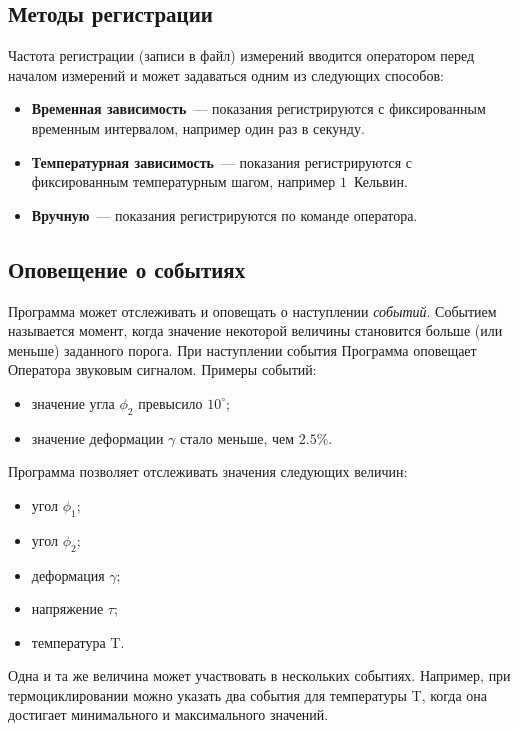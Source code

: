 \documentclass[12pt, a4paper, twocolumn]{report}
\begin{document}
\subsection{Методы регистрации}

\label{sec_registration_types}

Частота регистрации (записи в файл) измерений вводится оператором перед началом измерений и может задаваться одним из следующих способов:

\begin{itemize}
\item {\bf Временная зависимость}~--- показания регистрируются с фиксированным временным интервалом, например один раз в секунду.
\item {\bf Температурная зависимость}~--- показания регистрируются с фиксированным температурным шагом, например $1$~Кельвин.
\item \label{sec_reg_type_manual} {\bf Вручную}~--- показания регистрируются по команде оператора.
\end{itemize}

\subsection{Оповещение о событиях}
\label{sec_events}

Программа может отслеживать и оповещать о наступлении {\it событий}. Событием называется момент, когда значение некоторой величины становится больше (или меньше) заданного порога. При наступлении события Программа оповещает Оператора звуковым сигналом. Примеры событий:

\begin{itemize}
\item значение угла $\phi_2$ превысило $10^{\circ}$;
\item значение деформации $\gamma$ стало меньше, чем $2.5\%$.
\end{itemize}

Программа позволяет отслеживать значения следующих величин:

\begin{itemize}
\item угол $\phi_1$;
\item угол $\phi_2$;
\item деформация $\gamma$;
\item напряжение $\tau$;
\item температура T.
\end{itemize}

Одна и та же величина может участвовать в нескольких событиях. Например, при термоциклировании можно указать два события для температуры T, когда она достигает минимального и максимального значений.
\end{document}
